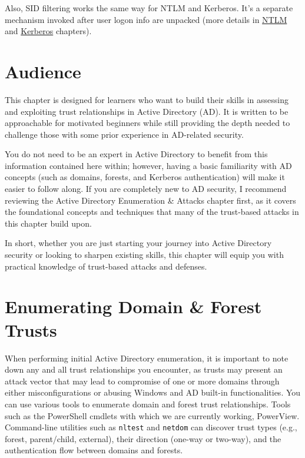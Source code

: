 Also, SID filtering works the same way for NTLM and Kerberos. It's a separate mechanism invoked after user logon info are unpacked (more details in \href{https://www.thehacker.recipes/ad/movement/trusts/index\#ntlm-authentication}{NTLM} and \href{https://www.thehacker.recipes/ad/movement/trusts/index\#kerberos-authentication}{Kerberos} chapters).

 


\section{Audience}
This chapter is designed for learners who want to build their skills in assessing and exploiting trust relationships in Active Directory (AD). It is written to be approachable for motivated beginners while still providing the depth needed to challenge those with some prior experience in AD-related security.

You do not need to be an expert in Active Directory to benefit from this information contained here within; however, having a basic familiarity with AD concepts (such as domains, forests, and Kerberos authentication) will make it easier to follow along. If you are completely new to AD security, I recommend reviewing the Active Directory Enumeration \& Attacks chapter first, as it covers the foundational concepts and techniques that many of the trust-based attacks in this chapter build upon.

In short, whether you are just starting your journey into Active Directory security or looking to sharpen existing skills, this chapter will equip you with practical knowledge of trust-based attacks and defenses.

\section{Enumerating Domain \& Forest Trusts}
When performing initial Active Directory enumeration, it is important to note down any and all trust relationships you encounter, as trusts may present an attack vector that may lead to compromise of one or more domains through either misconfigurations or abusing Windows and AD built-in functionalities.  You can use various tools to enumerate domain and forest trust relationships. Tools such as the PowerShell cmdlets with which we are currently working, PowerView.  Command-line utilities such as \texttt{nltest} and \texttt{netdom}
can discover trust types (e.g., forest, parent/child, external), their direction (one-way or two-way), and the authentication flow between domains and forests.

